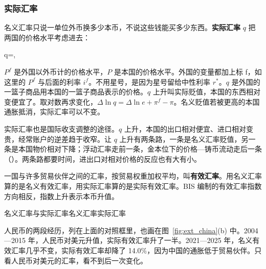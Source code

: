 \subsubsection{实际汇率}
名义汇率只说一单位外币换多少本币，不说这些钱能买多少东西。\textbf{实际汇率} $q$ 把两国的价格水平考虑进去：
\begin{keyeq}
q=,\label{eq:external-real}
\end{keyeq}
$P^{f}$ 是外国以外币计的价格水平，$P$ 是本国的价格水平。外国的变量都加上标 f，如这里的 $P^{f}$ 与后面的利率 $i^{f}$。不用星号，是因为星号留给中性利率 $r^{*}$。$q$ 是外国的一篮子商品用本国的一篮子商品表示的价格。$q$ 上升叫实际贬值，本国的东西相对变便宜了。取对数再求变化，$\Delta\ln q=\Delta\ln e+\pi^{f}-\pi$。名义贬值若被更高的本国通胀抵消，实际汇率可以不变。

实际汇率也是国际收支调整的途径。$q$ 上升，本国的出口相对便宜、进口相对变贵，经常账户的逆差趋于收窄。让 $q$ 上升有两条路，一条是名义汇率贬值，另一条是本国物价相对下降；浮动汇率走前一条，金本位下的价格—铸币流动走后一条（）。两条路都要时间，进出口对相对价格的反应也有大有小。

一国与许多贸易伙伴之间的汇率，按贸易权重加权平均，叫\textbf{有效汇率}。用名义汇率算的是名义有效汇率，用实际汇率算的是实际有效汇率。BIS 编制的有效汇率指数方向相反，指数上升表示本币升值。

\begin{compare}{名义汇率与实际汇率}{名义汇率}{实际汇率}
\end{compare}

人民币的两段经历，列在上面的对照框里，也画在图~\ref{fig:ext_china}(b) 中。2004—2015 年，人民币对美元升值，实际有效汇率升了一半。2021—2025 年，名义有效汇率几乎不变，实际有效汇率却降了 14.0\%，因为中国的通胀低于贸易伙伴\cite{bis2026}。只看人民币对美元的汇率，看不到后一次变化。

